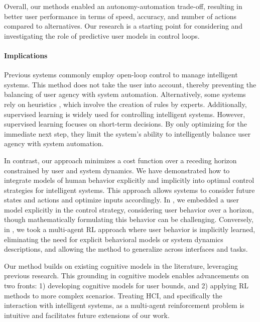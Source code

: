 Overall, our methods enabled an autonomy-automation trade-off, resulting in better user performance in terms of speed, accuracy, and number of actions compared to alternatives. Our research is a starting point for considering and investigating the role of predictive user models in control loops.

\paragraph{Implications}
Previous systems commonly employ open-loop control \cite{yamaoka2013depend} to manage intelligent systems. This method does not take the user into account, thereby preventing the balancing of user agency with system automation. Alternatively, some systems rely on heuristics \cite{Lopes16, Browne1990, Smith2010, Stephanidis1997}, which involve the creation of rules by experts. Additionally, supervised learning \cite{Maes1995, Lashkari1997, McCreath2006, Faulring2010, Shen2009a, Shen2009b, Berry2011, Pejovic2014, Mehrotra2015} is widely used for controlling intelligent systems. However, supervised learning focuses on short-term decisions. By only optimizing for the immediate next step, they limit the system's ability to intelligently balance user agency with system automation.

In contrast, our approach minimizes a cost function over a receding horizon constrained by user and system dynamics. We have demonstrated how to integrate models of human behavior explicitly and implicitly into optimal control strategies for intelligent systems. This approach allows systems to consider future states and actions and optimize inputs accordingly. In \magpen, we embedded a user model explicitly in the control strategy, considering user behavior over a horizon, though mathematically formulating this behavior can be challenging. Conversely, in \marlui, we took a multi-agent RL approach where user behavior is implicitly learned, eliminating the need for explicit behavioral models or system dynamics descriptions, and allowing the method to generalize across interfaces and tasks.

Our method builds on existing cognitive models in the literature, leveraging previous research. This grounding in cognitive models enables advancements on two fronts: 1) developing cognitive models for user bounds, and 2) applying RL methods to more complex scenarios. Treating HCI, and specifically the interaction with intelligent systems, as a multi-agent reinforcement problem is intuitive and facilitates future extensions of our work.

